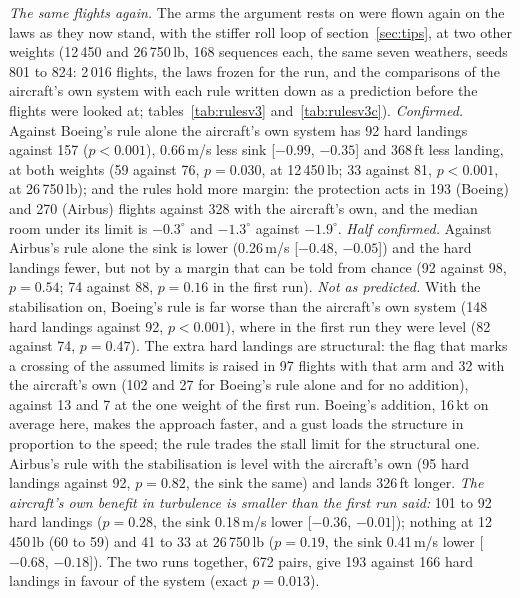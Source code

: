 \documentclass[10pt,a4paper,twocolumn]{article}
\begin{document}
\emph{The same flights again.} The arms the argument rests on were flown again on the laws as they now stand, with the stiffer roll loop of section~\ref{sec:tips}, at two other weights (12\,450 and 26\,750\,lb, 168 sequences each, the same seven weathers, seeds 801 to 824:
2\,016 flights, the laws frozen for the run, and the comparisons of the aircraft's own system with each rule written down as a prediction before the flights were looked at; tables~\ref{tab:rulesv3} and~\ref{tab:rulesv3c}).
\emph{Confirmed.} Against Boeing's rule alone the aircraft's own system has 92 hard landings against 157 ($p<0.001$), 0.66\,m/s less sink [$-0.99$, $-0.35$] and 368\,ft less landing, at both weights (59 against 76, $p=0.030$, at 12\,450\,lb; 33 against 81, $p<0.001$, at 26\,750\,lb); and the rules hold
more margin: the protection acts in 193 (Boeing) and 270 (Airbus) flights against 328 with the aircraft's own, and the median room under its limit is $-0.3^\circ$ and $-1.3^\circ$ against $-1.9^\circ$.
\emph{Half confirmed.} Against Airbus's rule alone the sink is lower (0.26\,m/s [$-0.48$, $-0.05$]) and the hard landings fewer, but not by a margin that can be told from chance (92 against 98, $p=0.54$; 74 against 88, $p=0.16$ in the first run).
\emph{Not as predicted.} With the stabilisation on, Boeing's rule is far worse than the aircraft's own system (148 hard landings against 92, $p<0.001$), where in the first run they were level (82 against 74, $p=0.47$). The extra hard landings are structural: the flag that marks a crossing of the assumed limits is raised in 97 flights with that arm
and 32 with the aircraft's own (102 and 27 for Boeing's rule alone and for no addition), against 13 and 7 at the one weight of the first run. Boeing's addition, 16\,kt on average here, makes the approach faster, and a gust loads the structure in proportion to the speed; the rule trades the stall limit for the structural one. Airbus's rule with the stabilisation is level
with the aircraft's own (95 hard landings against 92, $p=0.82$, the sink the same) and lands 326\,ft longer. \emph{The aircraft's own benefit in turbulence is smaller than the first run said:} 101 to 92 hard landings ($p=0.28$, the sink 0.18\,m/s lower [$-0.36$, $-0.01$]); nothing at 12\,450\,lb (60 to 59) and 41 to 33 at 26\,750\,lb
($p=0.19$, the sink 0.41\,m/s lower [$-0.68$, $-0.18$]). The two runs together, 672 pairs, give 193 against 166 hard landings in favour of the system (exact $p=0.013$).
\end{document}
